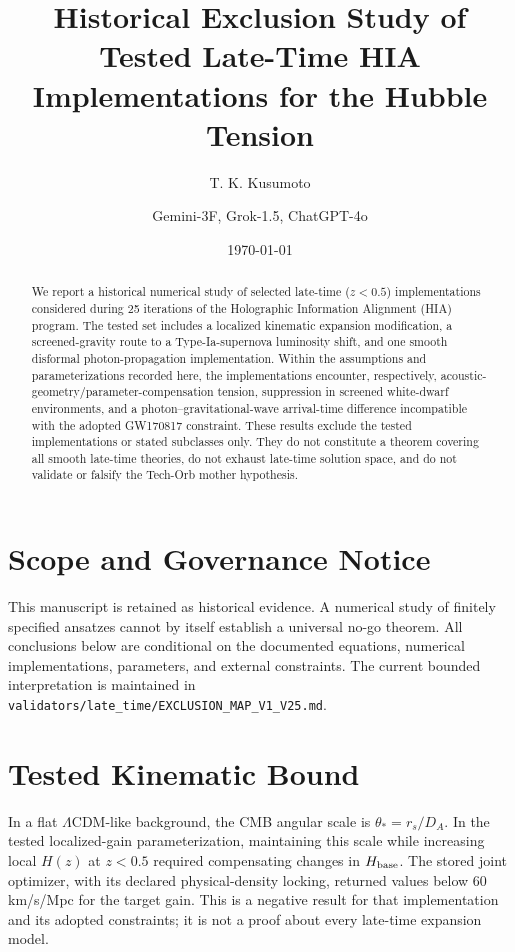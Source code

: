 \documentclass[reprint,amsmath,amssymb,aps,prd,floatfix]{revtex4-2}
\begin{document}
\title{Historical Exclusion Study of Tested Late-Time HIA Implementations for the Hubble Tension}

\author{T. K. Kusumoto}
\author{Gemini-3F, Grok-1.5, ChatGPT-4o}

\date{\today}

\begin{abstract}
We report a historical numerical study of selected late-time ($z<0.5$) implementations considered during 25 iterations of the Holographic Information Alignment (HIA) program. The tested set includes a localized kinematic expansion modification, a screened-gravity route to a Type-Ia-supernova luminosity shift, and one smooth disformal photon-propagation implementation. Within the assumptions and parameterizations recorded here, the implementations encounter, respectively, acoustic-geometry/parameter-compensation tension, suppression in screened white-dwarf environments, and a photon--gravitational-wave arrival-time difference incompatible with the adopted GW170817 constraint. These results exclude the tested implementations or stated subclasses only. They do not constitute a theorem covering all smooth late-time theories, do not exhaust late-time solution space, and do not validate or falsify the Tech-Orb mother hypothesis.
\end{abstract}

\maketitle

\section{Scope and Governance Notice}
This manuscript is retained as historical evidence. A numerical study of finitely specified ansatzes cannot by itself establish a universal no-go theorem. All conclusions below are conditional on the documented equations, numerical implementations, parameters, and external constraints. The current bounded interpretation is maintained in \texttt{validators/late\_time/EXCLUSION\_MAP\_V1\_V25.md}.

\section{Tested Kinematic Bound}
In a flat $\Lambda$CDM-like background, the CMB angular scale is $\theta_* = r_s/D_A$. In the tested localized-gain parameterization, maintaining this scale while increasing local $H(z)$ at $z<0.5$ required compensating changes in $H_{\rm base}$. The stored joint optimizer, with its declared physical-density locking, returned values below $60$ km/s/Mpc for the target gain. This is a negative result for that implementation and its adopted constraints; it is not a proof about every late-time expansion model.
\end{document}
